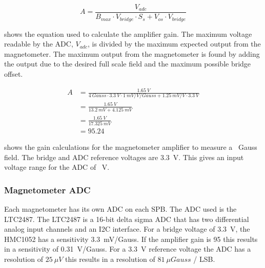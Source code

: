\begin{equation}
    \label{eq:amp-gain}
    A = \frac{V_{adc}}{B_{max} \cdot V_{bridge} \cdot S_s + V_{os} \cdot V_{bridge}}
\end{equation}

 shows the equation used to calculate the amplifier gain. The maximum voltage readable by the \ac{ADC}, $V_{adc}$, is divided by the maximum expected output from the magnetometer. The maximum output from the magnetometer is found by adding the output due to the desired full scale field and the maximum possible bridge offset.


\begin{equation}
    \label{eq:amp-gain-calc}
    \begin{split}
        A &= \frac{1.65~\unit{V}}{4~\unit{Gauss} \cdot 3.3~\unit{V} \cdot 1~\unit{mV/V/Gauss} + 1.25~\unit{mV/V} \cdot 3.3~\unit{V}}\\ 
          &= \frac{1.65~\unit{V}}{13.2~\unit{mV} + 4.125~\unit{mV}} \\
          &= \frac{1.65~\unit{V}}{17.325~\unit{mV}} \\
          &= 95.24
    \end{split}
\end{equation}

 shows the gain calculations for the magnetometer amplifier to measure a ~Gauss field. The bridge and \ac{ADC} reference voltages are 3.3~V. This gives an input voltage range for the \ac{ADC} of ~V.

\subsubsection{Magnetometer \acl{ADC}}

Each magnetometer has its own \ac{ADC} on each \ac{SPB}. The \ac{ADC} used is the LTC2487. The LTC2487 is a 16-bit delta sigma \ac{ADC} that has two differential analog input channels and an \ac{I2C} interface. For a bridge voltage of 3.3~V, the HMC1052 has a sensitivity 3.3~mV/Gauss. If the amplifier gain is 95 this results in a sensitivity of 0.31~V/Gauss. For a 3.3~V reference voltage the \ac{ADC} has a resolution of $25~\unit{\mu V}$ this results in a resolution of $81~\unit{\mu Gauss}$ / LSB.

